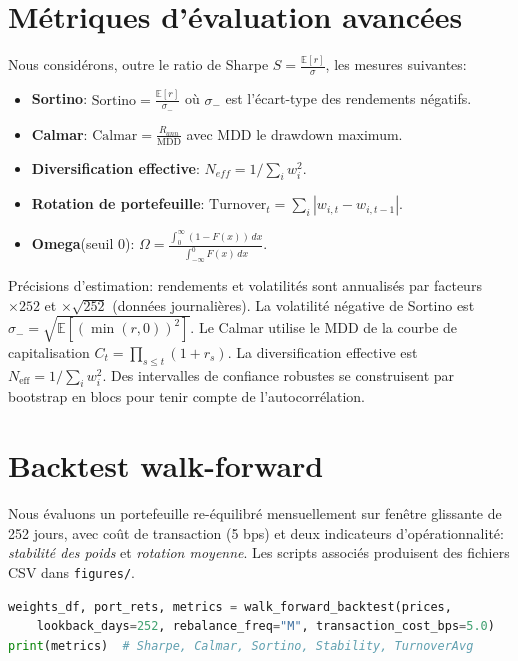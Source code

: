 \documentclass[11pt,a4paper]{article}
\begin{document}
\section{Métriques d'évaluation avancées}
Nous considérons, outre le ratio de Sharpe \(S=\frac{\mathbb E[r]}{\sigma}\), les mesures suivantes:
\begin{itemize}
  \item \textbf{Sortino}: \(\text{Sortino}=\frac{\mathbb E[r]}{\sigma_{-}}\) où \(\sigma_{-}\) est l'écart-type des rendements négatifs.
  \item \textbf{Calmar}: \(\text{Calmar}=\frac{R_{ann}}{\text{MDD}}\) avec \(\text{MDD}\) le drawdown maximum.
  \item \textbf{Diversification effective}: \(N_{eff}=1/\sum_i w_i^2\).
  \item \textbf{Rotation de portefeuille}: \(\text{Turnover}_t=\sum_i |w_{i,t}-w_{i,t-1}|\).
  \item \textbf{Omega}(seuil 0): \(\Omega=\frac{\int_0^{\infty}(1-F(x))\,dx}{\int_{-\infty}^0 F(x)\,dx}\).
\end{itemize}
\noindent Précisions d'estimation: rendements et volatilités sont annualisés par facteurs \(\times 252\) et \(\times \sqrt{252}\) (données journalières). La volatilité négative de Sortino est \(\sigma_- = \sqrt{\mathbb E[(\min(r,0))^2]}\). Le Calmar utilise le MDD de la courbe de capitalisation \(C_t=\prod_{s\le t}(1+r_s)\). La diversification effective est \(N_{\text{eff}}=1/\sum_i w_i^2\). Des intervalles de confiance robustes se construisent par bootstrap en blocs pour tenir compte de l'autocorrélation.



\section{Backtest walk-forward}
Nous évaluons un portefeuille re-équilibré mensuellement sur fenêtre glissante de 252 jours, avec coût de transaction (5 bps) et deux indicateurs d'opérationnalité: \emph{stabilité des poids} et \emph{rotation moyenne}. Les scripts associés produisent des fichiers CSV dans \texttt{figures/}.

\begin{lstlisting}[language=Python,caption={Backtest walk-forward (extrait)}]
weights_df, port_rets, metrics = walk_forward_backtest(prices,
    lookback_days=252, rebalance_freq="M", transaction_cost_bps=5.0)
print(metrics)  # Sharpe, Calmar, Sortino, Stability, TurnoverAvg
\end{lstlisting}
\end{document}
